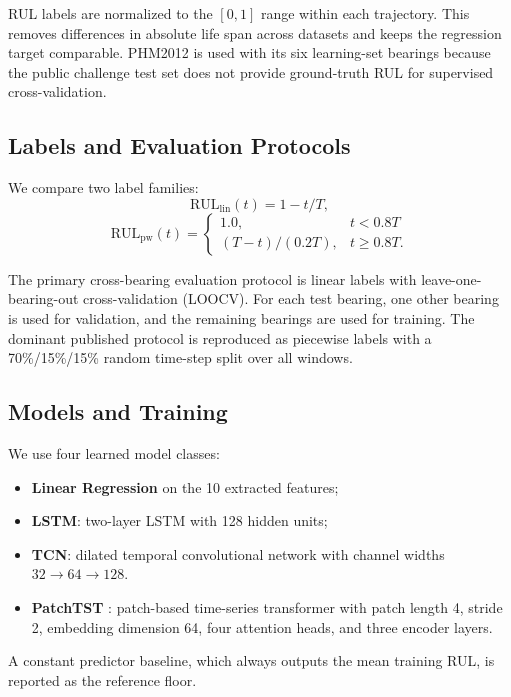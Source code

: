 \documentclass[5p,twocolumn]{elsarticle}
\begin{document}
RUL labels are normalized to the $[0,1]$ range within each trajectory. This removes differences in absolute life span across datasets and keeps the regression target comparable. PHM2012 is used with its six learning-set bearings because the public challenge test set does not provide ground-truth RUL for supervised cross-validation.

\subsection{Labels and Evaluation Protocols}
We compare two label families:
\begin{equation}
\text{RUL}_{\text{lin}}(t) = 1 - t/T,
\label{eq:linear}
\end{equation}
\begin{equation}
\text{RUL}_{\text{pw}}(t) =
\begin{cases}
1.0, & t < 0.8T \\
(T - t)/(0.2T), & t \geq 0.8T.
\end{cases}
\label{eq:piecewise}
\end{equation}

The primary cross-bearing evaluation protocol is linear labels with leave-one-bearing-out cross-validation (LOOCV). For each test bearing, one other bearing is used for validation, and the remaining bearings are used for training. The dominant published protocol is reproduced as piecewise labels with a 70\%/15\%/15\% random time-step split over all windows.

\subsection{Models and Training}
We use four learned model classes:
\begin{itemize}
    \item \textbf{Linear Regression} on the 10 extracted features;
    \item \textbf{LSTM}: two-layer LSTM with 128 hidden units;
    \item \textbf{TCN}: dilated temporal convolutional network with channel widths $32 \to 64 \to 128$.
    \item \textbf{PatchTST} \cite{patchtst2023}: patch-based time-series transformer with patch length 4, stride 2, embedding dimension 64, four attention heads, and three encoder layers.
\end{itemize}
A constant predictor baseline, which always outputs the mean training RUL, is reported as the reference floor.
\end{document}
